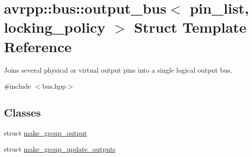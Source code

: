 \hypertarget{structavrpp_1_1bus_1_1output__bus}{
\section{avrpp::bus::output\_\-bus$<$ pin\_\-list, locking\_\-policy $>$ Struct Template Reference}
\label{structavrpp_1_1bus_1_1output__bus}
}


Joins several physical or virtual output pins into a single logical output bus.  




{\ttfamily \#include $<$bus.hpp$>$}

\subsection*{Classes}
\begin{DoxyCompactItemize}
\item 
struct \hyperlink{structavrpp_1_1bus_1_1output__bus_1_1make__group__output}{make\_\-group\_\-output}
\item 
struct \hyperlink{structavrpp_1_1bus_1_1output__bus_1_1make__group__update__outputs}{make\_\-group\_\-update\_\-outputs}
\end{DoxyCompactItemize}
